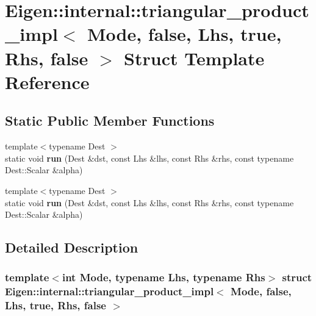 \hypertarget{struct_eigen_1_1internal_1_1triangular__product__impl_3_01_mode_00_01false_00_01_lhs_00_01true_00_01_rhs_00_01false_01_4}{}\section{Eigen\+:\+:internal\+:\+:triangular\+\_\+product\+\_\+impl$<$ Mode, false, Lhs, true, Rhs, false $>$ Struct Template Reference}
\label{struct_eigen_1_1internal_1_1triangular__product__impl_3_01_mode_00_01false_00_01_lhs_00_01true_00_01_rhs_00_01false_01_4}
\subsection*{Static Public Member Functions}
\begin{DoxyCompactItemize}
\item 
\mbox{\label{struct_eigen_1_1internal_1_1triangular__product__impl_3_01_mode_00_01false_00_01_lhs_00_01true_00_01_rhs_00_01false_01_4_a4783a1794a39399921609a30e1827258}} 
{\footnotesize template$<$typename Dest $>$ }\\static void {\bfseries run} (Dest \&dst, const Lhs \&lhs, const Rhs \&rhs, const typename Dest\+::\+Scalar \&alpha)
\item 
\mbox{\label{struct_eigen_1_1internal_1_1triangular__product__impl_3_01_mode_00_01false_00_01_lhs_00_01true_00_01_rhs_00_01false_01_4_a4783a1794a39399921609a30e1827258}} 
{\footnotesize template$<$typename Dest $>$ }\\static void {\bfseries run} (Dest \&dst, const Lhs \&lhs, const Rhs \&rhs, const typename Dest\+::\+Scalar \&alpha)
\end{DoxyCompactItemize}


\subsection{Detailed Description}
\subsubsection*{template$<$int Mode, typename Lhs, typename Rhs$>$\newline
struct Eigen\+::internal\+::triangular\+\_\+product\+\_\+impl$<$ Mode, false, Lhs, true, Rhs, false $>$}



